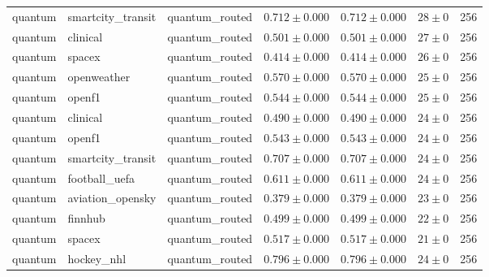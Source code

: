 \begin{table}[htbp]
\begin{tabular}{l l l r r r r}
quantum & smartcity\_transit & quantum\_routed & $0.712\pm0.000$ & $0.712\pm0.000$ & $28\pm0$ & 256 \\
quantum & clinical & quantum\_routed & $0.501\pm0.000$ & $0.501\pm0.000$ & $27\pm0$ & 256 \\
quantum & spacex & quantum\_routed & $0.414\pm0.000$ & $0.414\pm0.000$ & $26\pm0$ & 256 \\
quantum & openweather & quantum\_routed & $0.570\pm0.000$ & $0.570\pm0.000$ & $25\pm0$ & 256 \\
quantum & openf1 & quantum\_routed & $0.544\pm0.000$ & $0.544\pm0.000$ & $25\pm0$ & 256 \\
quantum & clinical & quantum\_routed & $0.490\pm0.000$ & $0.490\pm0.000$ & $24\pm0$ & 256 \\
quantum & openf1 & quantum\_routed & $0.543\pm0.000$ & $0.543\pm0.000$ & $24\pm0$ & 256 \\
quantum & smartcity\_transit & quantum\_routed & $0.707\pm0.000$ & $0.707\pm0.000$ & $24\pm0$ & 256 \\
quantum & football\_uefa & quantum\_routed & $0.611\pm0.000$ & $0.611\pm0.000$ & $24\pm0$ & 256 \\
quantum & aviation\_opensky & quantum\_routed & $0.379\pm0.000$ & $0.379\pm0.000$ & $23\pm0$ & 256 \\
quantum & finnhub & quantum\_routed & $0.499\pm0.000$ & $0.499\pm0.000$ & $22\pm0$ & 256 \\
quantum & spacex & quantum\_routed & $0.517\pm0.000$ & $0.517\pm0.000$ & $21\pm0$ & 256 \\
quantum & hockey\_nhl & quantum\_routed & $0.796\pm0.000$ & $0.796\pm0.000$ & $24\pm0$ & 256 \\
\hline
\end{tabular}
\end{table}
